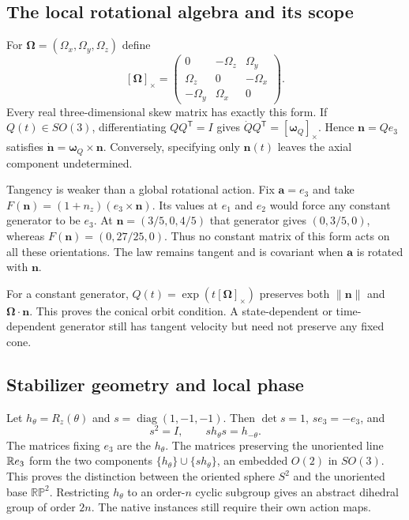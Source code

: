 \subsection{The local rotational algebra and its scope}
For $\boldsymbol\Omega=(\Omega_x,\Omega_y,\Omega_z)$ define
\[
[\boldsymbol\Omega]_\times=
\begin{pmatrix}
0&-\Omega_z&\Omega_y\\
\Omega_z&0&-\Omega_x\\
-\Omega_y&\Omega_x&0
\end{pmatrix}.
\]
Every real three-dimensional skew matrix has exactly this form. If $Q(t)\in SO(3)$, differentiating $QQ^{\mathsf T}=I$ gives $\dot Q Q^{\mathsf T}=[\boldsymbol\omega_Q]_\times$. Hence $\mathbf n=Qe_3$ satisfies $\dot{\mathbf n}=\boldsymbol\omega_Q\times\mathbf n$. Conversely, specifying only $\mathbf n(t)$ leaves the axial component undetermined.

Tangency is weaker than a global rotational action. Fix $\mathbf a=e_3$ and take $F(\mathbf n)=(1+n_z)(e_3\times\mathbf n)$. Its values at $e_1$ and $e_2$ would force any constant generator to be $e_3$. At $\mathbf n=(3/5,0,4/5)$ that generator gives $(0,3/5,0)$, whereas $F(\mathbf n)=(0,27/25,0)$. Thus no constant matrix of this form acts on all these orientations. The law remains tangent and is covariant when $\mathbf a$ is rotated with $\mathbf n$.

For a constant generator, $Q(t)=\exp(t[\boldsymbol\Omega]_\times)$ preserves both $\|\mathbf n\|$ and $\boldsymbol\Omega\cdot\mathbf n$. This proves the conical orbit condition. A state-dependent or time-dependent generator still has tangent velocity but need not preserve any fixed cone.

\subsection{Stabilizer geometry and local phase}
Let $h_\theta=R_z(\theta)$ and $s=\operatorname{diag}(1,-1,-1)$. Then $\det s=1$, $se_3=-e_3$, and
\[
s^2=I,\qquad sh_\theta s=h_{-\theta}.
\]
The matrices fixing $e_3$ are the $h_\theta$. The matrices preserving the unoriented line $\mathbb R e_3$ form the two components $\{h_\theta\}\cup\{s h_\theta\}$, an embedded $O(2)$ in $SO(3)$. This proves the distinction between the oriented sphere $S^2$ and the unoriented base $\mathbb{RP}^2$. Restricting $h_\theta$ to an order-$n$ cyclic subgroup gives an abstract dihedral group of order $2n$. The native instances still require their own action maps.

